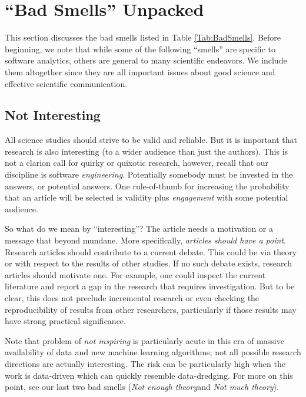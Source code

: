 \documentclass[10pt]{elsarticle}
\newcommand{\RRED}{\color{red}}
\newcommand{\BLACK}{\color{black}}
\begin{document}
 
\section{``Bad Smells'' Unpacked}\label{tion:BadSmells}
This section discusses the bad smells listed in Table \ref{Tab:BadSmells}.
Before beginning, we note that while some of the following ``smells'' are specific to software analytics, others are general to many scientific endeavors.  We include them altogether since they are all important issues about good science and effective scientific communication.


\subsection{Not Interesting}

All science studies should strive to be valid and reliable. But it is important that research is also interesting (to a wider audience than just the authors).  This is not a clarion call for quirky or quixotic research, however, recall that our discipline is software \textit{engineering}. Potentially somebody must be invested in the answers, or potential answers.  One rule-of-thumb for increasing the probability that an article will be selected is validity plus {\em engagement} with some potential audience. 


So what do we mean by ``interesting''?  The article needs a motivation or a message that beyond mundane.  More specifically, {\em articles should have a point}. Research articles should contribute to a current debate. \RRED This could be via theory or with respect to the results of other studies. \BLACK If no such debate exists, research articles should motivate one.  For example, one could inspect the current literature and report a gap in the research that requires investigation.  But to be clear, this does not preclude incremental research or even checking the reproducibility of results from other researchers, particularly if those results may have strong practical significance.

Note that problem of {\em not inspiring} is particularly acute in this era of massive availability of data and new machine learning algorithms; not all possible research directions are actually interesting.  The risk can be particularly high when the work is data-driven which can quickly resemble data-dredging. For more on this point, see our last two bad smells ({\em Not enough theory}and {\em Not much theory}).
\end{document}
